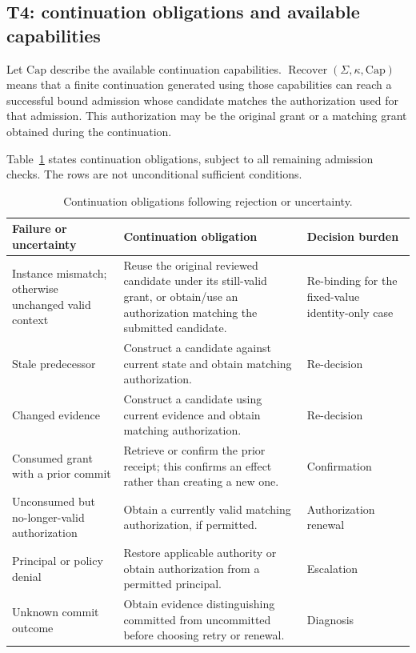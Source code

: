 \subsection{T4: continuation obligations and available capabilities}
\label{app:t4}
Let $\mathrm{Cap}$ describe the available continuation capabilities.
$\operatorname{Recover}(\Sigma,\kappa,\mathrm{Cap})$ means that a finite continuation generated using those capabilities can reach a successful bound admission whose candidate matches the authorization used for that admission. This authorization may be the original grant or a matching grant obtained during the continuation.

Table~\ref{tab:appendix-continuation} states continuation obligations, subject to all remaining admission checks. The rows are not unconditional sufficient conditions.

\begin{table}[htbp]
\centering\small
\caption{Continuation obligations following rejection or uncertainty.}
\label{tab:appendix-continuation}
\begin{tabularx}{\textwidth}{@{}>{\raggedright\arraybackslash}p{}>{\raggedright\arraybackslash}X>{\raggedright\arraybackslash}p{}@{}}
\toprule
Failure or uncertainty & Continuation obligation & Decision burden\\
\midrule
Instance mismatch; otherwise unchanged valid context &
Reuse the original reviewed candidate under its still-valid grant, or obtain/use an authorization matching the submitted candidate. &
Re-binding for the fixed-value identity-only case\\
Stale predecessor &
Construct a candidate against current state and obtain matching authorization. &
Re-decision\\
Changed evidence &
Construct a candidate using current evidence and obtain matching authorization. &
Re-decision\\
Consumed grant with a prior commit &
Retrieve or confirm the prior receipt; this confirms an effect rather than creating a new one. &
Confirmation\\
Unconsumed but no-longer-valid authorization &
Obtain a currently valid matching authorization, if permitted. &
Authorization renewal\\
Principal or policy denial &
Restore applicable authority or obtain authorization from a permitted principal. &
Escalation\\
Unknown commit outcome &
Obtain evidence distinguishing committed from uncommitted before choosing retry or renewal. &
Diagnosis\\
\bottomrule
\end{tabularx}
\end{table}

